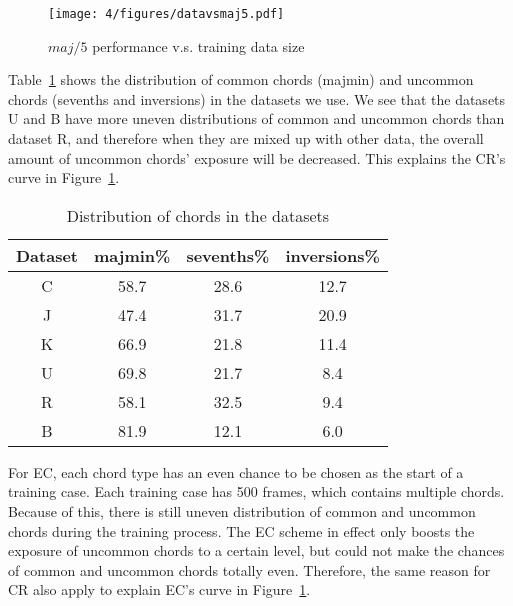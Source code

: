 \begin{figure}[htb]
	\centering
	\texttt{[image: 4/figures/datavsmaj5.pdf]}
	\caption{$maj/5$ performance v.s. training data size}
	\label{fig:4-datavsmaj5}
\end{figure}

Table~\ref{tab:4-chorddist} shows the distribution of common chords (majmin) and uncommon chords (sevenths and inversions) in the datasets we use. We see that the datasets U and B have more uneven distributions of common and uncommon chords than dataset R, and therefore when they are mixed up with other data, the overall amount of uncommon chords' exposure will be decreased. This explains the CR's curve in Figure~\ref{fig:4-datavsmaj5}.
\begin{table}[h]
	\centering
	\scriptsize
	\begin{tabular}{|c|c|c|c|}\hline
		Dataset & majmin\% & sevenths\% & inversions\%\\ \hline
		C & 58.7 &	28.6 & 12.7\\ \hline
		J & 47.4 & 31.7 & 20.9\\ \hline
		K & 66.9 & 21.8 & 11.4\\ \hline
		U & 69.8 & 21.7 & 8.4\\ \hline
		R & 58.1 & 32.5 & 9.4\\ \hline
		B & 81.9 & 12.1 & 6.0\\ \hline
	\end{tabular}
	\caption{Distribution of chords in the datasets}
	\label{tab:4-chorddist}
\end{table}
For EC, each chord type has an even chance to be chosen as the start of a training case. Each training case has 500 frames, which contains multiple chords. Because of this, there is still uneven distribution of common and uncommon chords during the training process. The EC scheme in effect only boosts the exposure of uncommon chords to a certain level, but could not make the chances of common and uncommon chords totally even. Therefore, the same reason for CR also apply to explain EC's curve in Figure~\ref{fig:4-datavsmaj5}.


